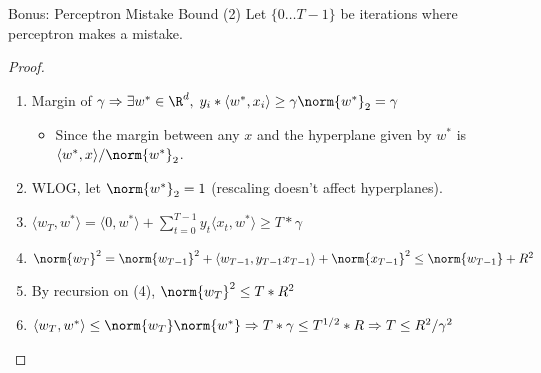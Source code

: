 \documentclass[notheorems]{beamer}
\begin{document}
    \begin{frame}{Bonus: Perceptron Mistake Bound (2)}
        Let $\{0 \dots T-1\}$ be iterations where perceptron makes a mistake.
        \begin{proof}
            \begin{enumerate}
                \item Margin of $\gamma \Rightarrow \exists w^* \in \R^d, \; y_i *\langle w^*, x_i \rangle \geq  \gamma \norm{w^*}_2 = \gamma$
                \begin{itemize}
                    \item Since the margin between any $x$ and the hyperplane given by $w^*$ is $\langle w^*, x \rangle / \norm{w^*}_2$.
                \end{itemize}
                \item WLOG, let $\norm{w^*}_2 = 1$ (rescaling doesn't affect hyperplanes).
                \item $\langle w_{T}, w^* \rangle = \langle 0, w^* \rangle + \sum_{t=0}^{T-1} y_t \langle x_{t}, w^* \rangle \geq T * \gamma$\
                \item $\norm{w_T}^2 = \norm{w_{T-1}}^2 + \langle w_{T-1}, y_{T-1} x_{T-1} \rangle + \norm{x_{T-1}}^2 \leq \norm{w_{T-1}} + R^2$
                \item By recursion on (4), $\norm{w_T}^2 \leq T * R^2$
                \item $\langle w_T, w^* \rangle \leq \norm{w_T}\norm{w^*} \Rightarrow T * \gamma \leq T^{1/2} * R \Rightarrow T \leq R^2 / \gamma^2$
            \end{enumerate}

        \end{proof}

    \end{frame}
\end{document}
